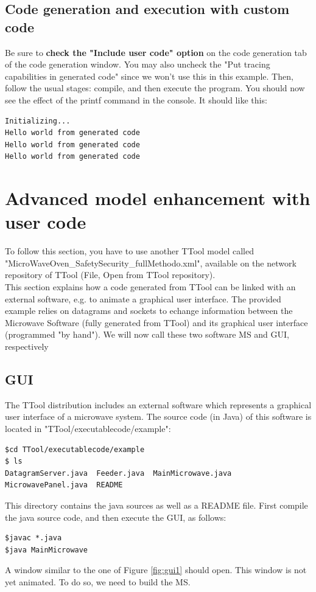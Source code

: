 \documentclass[12pt]{article}
\begin{document}
\subsection{Code generation and execution with custom code}

Be sure to \textbf{check the "Include user code" option} on the code generation tab of the code generation window. You may also uncheck the "Put tracing capabilities in generated code" since we won't use this in this example. Then, follow the usual stages: compile, and then execute the program. You should now see the effect of the printf command in the console. It should like this:
\begin{lstlisting}
Initializing...
Hello world from generated code
Hello world from generated code
Hello world from generated code
\end{lstlisting}

\newpage
\section{Advanced model enhancement with user code}\label{sec:advanced}
To follow this section, you have to use another TTool model called "MicroWaveOven\_SafetySecurity\_fullMethodo.xml", available on the network repository of TTool (File, Open from TTool repository).\\
This section explains how a code generated from TTool can be linked with an external software, e.g. to animate a graphical user interface. The provided example relies on datagrams and sockets to echange information between the Microwave Software (fully generated from TTool) and its graphical user interface (programmed "by hand"). We will now call these two software MS and GUI, respectively

\subsection{GUI}
The TTool distribution includes an external software which represents a graphical user interface of a microwave system. The source code (in Java) of this software is located in "TTool/executablecode/example":
\begin{lstlisting}
$cd TTool/executablecode/example
$ ls
DatagramServer.java  Feeder.java  MainMicrowave.java  MicrowavePanel.java  README
\end{lstlisting}
This directory contains the java sources as well as a README file. First compile the java source code, and then execute the GUI, as follows:
\begin{lstlisting}
$javac *.java
$java MainMicrowave
\end{lstlisting}
A window similar to the one of Figure \ref{fig:gui1} should open. This window is not yet animated. To do so, we need to build the MS.
\end{document}
